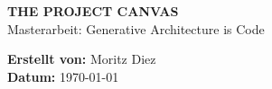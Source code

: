 \documentclass[a4paper, landscape, 10pt]{article}
\begin{document}
\begin{minipage}{0.7\textwidth}
    {\huge \textbf{THE PROJECT CANVAS}} \\
    {\large Masterarbeit: Generative \glqq Architecture is Code\grqq}
\end{minipage}
\hfill
\begin{minipage}{0.25\textwidth}
    \raggedleft
    \textbf{Erstellt von:} Moritz Diez \\
    \textbf{Datum:} \today
\end{minipage}

\vspace{0.5cm}

\end{document}
